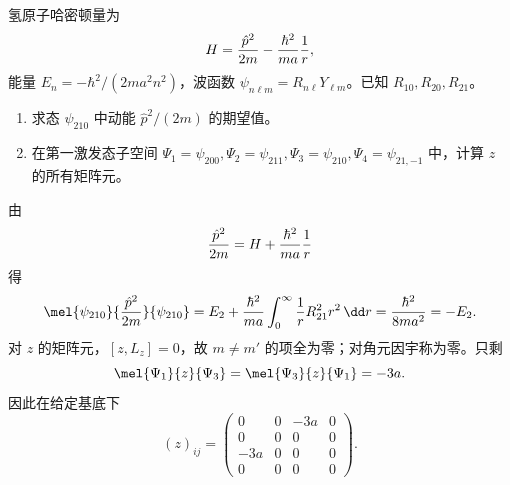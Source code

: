\begin{question}
氢原子哈密顿量为
\[
  H={\hat p^2\over2m}-{\hbar^2\over ma}{1\over r},
\]
能量 $E_n=-\hbar^2/(2ma^2n^2)$，波函数 $\psi_{n\ell m}=R_{n\ell}Y_{\ell m}$。已知 $R_{10},R_{20},R_{21}$。
\begin{enumerate}
  \item 求态 $\psi_{210}$ 中动能 $\hat p^2/(2m)$ 的期望值。
  \item 在第一激发态子空间 $\Psi_1=\psi_{200},\Psi_2=\psi_{211},\Psi_3=\psi_{210},\Psi_4=\psi_{21,-1}$ 中，计算 $z$ 的所有矩阵元。
\end{enumerate}
\begin{solution}
由
\[
  {\hat p^2\over2m}=H+{\hbar^2\over ma}{1\over r}
\]
得
\[
  \mel{\psi_{210}}{{\hat p^2\over2m}}{\psi_{210}}
  =E_2+{\hbar^2\over ma}\int_0^\infty {1\over r}R_{21}^2r^2\,\dd r
  ={\hbar^2\over8ma^2}=-E_2 .
\]
对 $z$ 的矩阵元，$[z,L_z]=0$，故 $m\ne m'$ 的项全为零；对角元因宇称为零。只剩
\[
  \mel{\Psi_1}{z}{\Psi_3}=\mel{\Psi_3}{z}{\Psi_1}=-3a .
\]
因此在给定基底下
\[
  (z)_{ij}=
  \begin{pmatrix}
  0&0&-3a&0\\
  0&0&0&0\\
  -3a&0&0&0\\
  0&0&0&0
  \end{pmatrix}.
\]
\end{solution}
\end{question}

